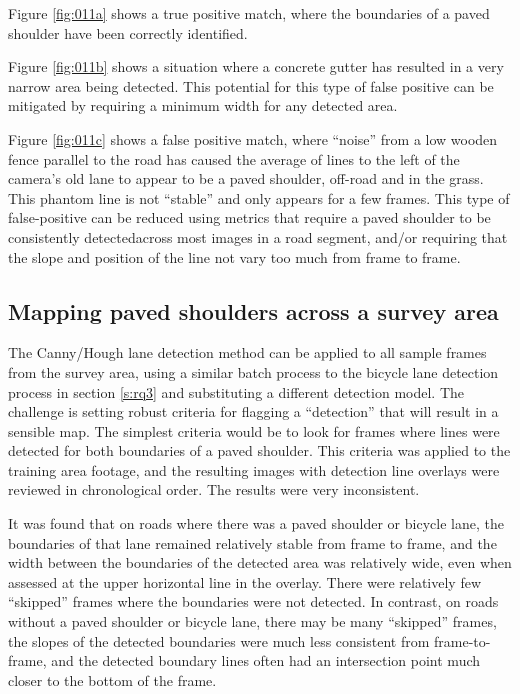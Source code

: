 \documentclass[11pt,twoside]{report}
\begin{document}
Figure \ref{fig:011a} shows a true positive match, where the boundaries of a paved shoulder have been correctly identified.

Figure \ref{fig:011b} shows a situation where a concrete gutter has resulted in a very narrow area being detected.  This potential for this type of false positive can be mitigated by requiring a minimum width for any detected area.

Figure \ref{fig:011c} shows a false positive match, where ``noise'' from a low wooden fence parallel to the road has caused the average of lines to the left of the camera's old lane to appear to be a paved shoulder, off-road and in the grass.  This phantom line is not ``stable'' and only appears for a few frames.  This type of false-positive can be reduced using metrics that require a paved shoulder to be consistently detectedacross most images in a road segment, and/or requiring that the slope and position of the line not vary too much from frame to frame.


\subsection{Mapping paved shoulders across a survey area}
\label{s:rq4c}

The Canny/Hough lane detection method can be applied to all sample frames from the survey area, using a similar batch process to the bicycle lane detection process in section \ref{s:rq3} and substituting a different detection model.  The challenge is setting robust criteria for flagging a ``detection'' that will result in a sensible map.  The simplest criteria would be to look for frames where lines were detected for both boundaries of a paved shoulder.  This criteria was applied to the training area footage, and the resulting images with detection line overlays were reviewed in chronological order.  The results were very inconsistent.

It was found that on roads where there was a paved shoulder or bicycle lane, the boundaries of that lane remained relatively stable from frame to frame, and the width between the boundaries of the detected area was relatively wide, even when assessed at the upper horizontal line in the overlay.  There were relatively few ``skipped'' frames where the boundaries were not detected.  In contrast, on roads without a paved shoulder or bicycle lane, there may be many ``skipped'' frames, the slopes of the detected boundaries were much less consistent from frame-to-frame, and the detected boundary lines often had an intersection point much closer to the bottom of the frame.
\end{document}
